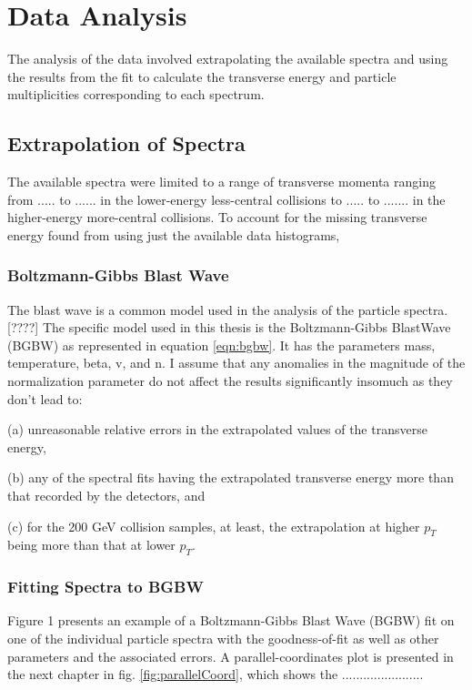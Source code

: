 \chapter{Data Analysis} \label{ch:analysis}
The analysis of the data involved extrapolating the available spectra and using the results from the fit to calculate the transverse energy and particle multiplicities corresponding to each spectrum. 
\section{Extrapolation of Spectra}
The available spectra were limited to a range of transverse momenta ranging from ..... to ...... in the lower-energy less-central collisions to  ..... to ....... in the higher-energy more-central collisions. To account for the missing transverse energy found from using just the available data histograms,
\subsection{Boltzmann-Gibbs Blast Wave}
The blast wave is a common model used in the analysis of the particle spectra.[????] The specific model used in this thesis is the Boltzmann-Gibbs BlastWave (BGBW) as represented in equation \ref{eqn:bgbw}. It has the parameters mass, temperature, beta, v, and n. I assume that any anomalies in the magnitude of the normalization parameter do not affect the results significantly insomuch as they don't lead to: 

(a) unreasonable relative errors in the extrapolated values of the transverse energy,

(b) any of the spectral fits having the extrapolated transverse energy more than that recorded by the detectors, and

(c) for the 200 GeV collision samples, at least, the extrapolation at higher $p_{T}$ being more than that at lower $p_{T}$.

\subsection{Fitting Spectra to BGBW}
Figure 1 presents an example of a Boltzmann-Gibbs Blast Wave (BGBW) fit on one of the individual particle spectra with the goodness-of-fit as well as other parameters and the associated errors. A parallel-coordinates plot is presented in the next chapter in fig. \ref{fig:parallelCoord}, which shows the ....................... 


